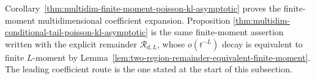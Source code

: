 \begin{remark}
Corollary~\ref{thm:multidim-finite-moment-poisson-kl-asymptotic} proves
the finite-moment multidimensional coefficient expansion.  Proposition
\ref{thm:multidim-conditional-tail-poisson-kl-asymptotic} is the same
finite-moment assertion written with the explicit remainder
\(\mathcal R_{d,L}\), whose \(o(t^{-L})\) decay is equivalent to finite
\(L\)-moment by
Lemma~\ref{lem:two-region-remainder-equivalent-finite-moment}.  The leading
coefficient route is the one stated at the start of this subsection.
\end{remark}
